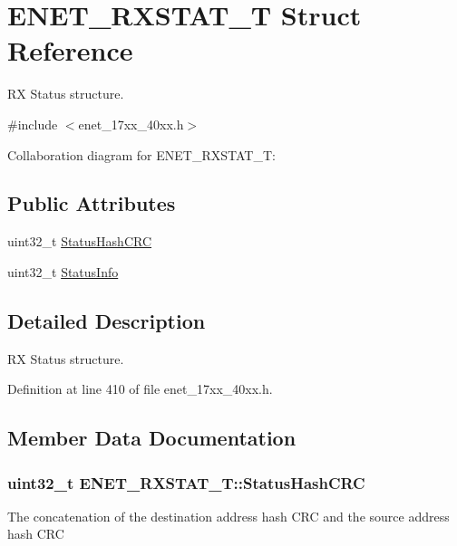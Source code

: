 \hypertarget{structENET__RXSTAT__T}{}\section{E\+N\+E\+T\+\_\+\+R\+X\+S\+T\+A\+T\+\_\+T Struct Reference}
\label{structENET__RXSTAT__T}


RX Status structure.  




{\ttfamily \#include $<$enet\+\_\+17xx\+\_\+40xx.\+h$>$}



Collaboration diagram for E\+N\+E\+T\+\_\+\+R\+X\+S\+T\+A\+T\+\_\+T\+:
\subsection*{Public Attributes}
\begin{DoxyCompactItemize}
\item 
uint32\+\_\+t \hyperlink{structENET__RXSTAT__T_a52d71f70dc193d59f6cb67241d92a4c9}{Status\+Hash\+C\+RC}
\item 
uint32\+\_\+t \hyperlink{structENET__RXSTAT__T_a0d2de29791ff4358c5cc4dedd694857d}{Status\+Info}
\end{DoxyCompactItemize}


\subsection{Detailed Description}
RX Status structure. 

Definition at line 410 of file enet\+\_\+17xx\+\_\+40xx.\+h.



\subsection{Member Data Documentation}
\subsubsection[{\texorpdfstring{Status\+Hash\+C\+RC}{StatusHashCRC}}]{\setlength{\rightskip}{0pt plus 5cm}uint32\+\_\+t E\+N\+E\+T\+\_\+\+R\+X\+S\+T\+A\+T\+\_\+\+T\+::\+Status\+Hash\+C\+RC}\hypertarget{structENET__RXSTAT__T_a52d71f70dc193d59f6cb67241d92a4c9}{}\label{structENET__RXSTAT__T_a52d71f70dc193d59f6cb67241d92a4c9}
The concatenation of the destination address hash C\+RC and the source address hash C\+RC 

